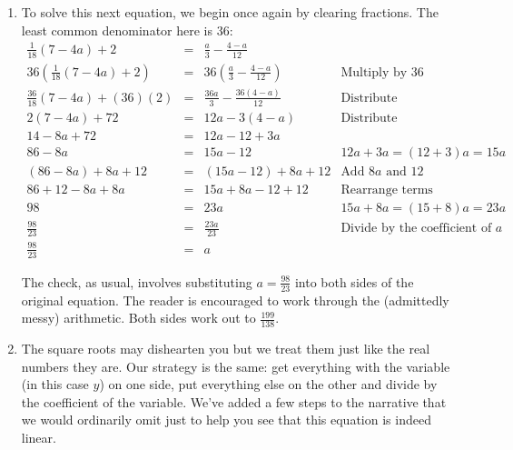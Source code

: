 \documentclass{ximera}
\begin{document}
\begin{example}
\begin{enumerate}
To check, we again substitute $t = \frac{20}{13}$ into each side of the original equation.  We find that $3 - 1.7 \left(\frac{20}{13}\right) = 3 - \left(\frac{17}{10}\right)\left(\frac{20}{13}\right) =   \frac{5}{13}$ and $\frac{(20/13)}{4} = \frac{20}{13} \cdot \frac{1}{4} = \frac{5}{13}$ as well.

\item  To solve this next equation, we begin once again by clearing fractions.  The least common denominator here is $36$:\[ \begin{array}{rclr}

  \frac{1}{18}(7 - 4a) + 2 & = &  \frac{a}{3} -  \frac{4-a}{12} & \\ 

36 \left( \frac{1}{18}(7 - 4a) + 2\right) & = & 36 \left( \frac{a}{3} -  \frac{4-a}{12}\right) & \text{Multiply by $36$} \\[13pt]

 \frac{36}{18} (7-4a) + (36)(2) & = &  \frac{36a}{3} -  \frac{36(4-a)}{12} & \text{Distribute} \\ 

2(7-4a)  + 72 & = & 12 a - 3(4-a) & \text{Distribute} \\

14  - 8a + 72 & = & 12a - 12 + 3a & \\

86 - 8a & = & 15 a - 12 & \text{$12 a + 3a = (12+3)a = 15a$} \\

(86-8a)+8a+12 & = & (15a-12) + 8a + 12 & \text{Add $8a$ and $12$} \\

86 + 12 - 8a + 8a & = & 15a + 8a - 12 + 12 & \text{Rearrange terms} \\

98 & = & 23 a & \text{$15a + 8a = (15+8)a = 23a$} \\  

 \frac{98}{23} & = &  \frac{23a}{23} & \text{Divide by the coefficient of $a$} \\ 

 \frac{98}{23} & = & a &

\end{array} \]

The check, as usual, involves substituting $a = \frac{98}{23}$ into both sides of the original equation.  The reader is encouraged to work through the (admittedly messy) arithmetic.  Both sides work out to $\frac{199}{138}$.


\item  The square roots may dishearten you but we treat them just like the real numbers they are.  Our strategy is the same:  get everything with the variable (in this case $y$) on one side, put everything else on the other and divide by the coefficient of the variable.  We've added a few steps to the narrative that we would ordinarily omit just to help you see that this equation is indeed linear.\[ \begin{array}{rclr}


\end{array}\]
\end{enumerate}
\end{example}
\end{document}
